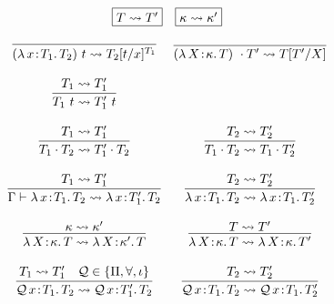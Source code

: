 \documentclass{article}
\newcommand{\abs}[4]{{#1}\, #2\! : \! #3.\, #4}
\begin{document}
\begin{figure}
  \[
    \begin{array}{c}
      \fbox{\(T \rightsquigarrow T'\)}
      \quad \fbox{\(\kappa \rightsquigarrow \kappa'\)}
      \\ \\
      \begin{array}{cc}
        \infer{
         (\abs{\lambda}{x}{T_1}{T_2})\ t
         \rightsquigarrow
         T_2 [t/x]^{T_1}
        }{}
        &
          \infer{
           (\abs{\lambda}{X}{\kappa}{T})\ \cdot T'
           \rightsquigarrow
           T [T'/X]
          }{}
        \\ \\
        \infer{
         T_1\ t
         \rightsquigarrow
         T_1'\ t
        }{
         T_1 \rightsquigarrow T_1'
        }
        \\ \\
          \infer{
           T_1 \cdot T_2
           \rightsquigarrow
           T_1' \cdot T_2
          }{
           T_1 \rightsquigarrow T_1'
          }
        & 
        \infer{
         T_1 \cdot T_2
         \rightsquigarrow T_1 \cdot T_2'
        }{
         T_2 \rightsquigarrow T_2'
        }
        \\ \\
        \infer{
         \Gamma \vdash \abs{\lambda}{x}{T_1}{T_2} \leadsto \abs{\lambda}{x}{T_1'}{T_2}
        }{
         T_1 \leadsto T_1'
        }
        &
        \infer{
         \abs{\lambda}{x}{T_1}{T_2}
         \rightsquigarrow
         \abs{\lambda}{x}{T_1}{T_2'}
        }{
         T_2 \rightsquigarrow T_2'
        }
        \\ \\
        \infer{
         \abs{\lambda}{X}{\kappa}{T}
         \leadsto \abs{\lambda}{X}{\kappa'}{T}
        }{
         \kappa \leadsto \kappa'
        }
        &
        \infer{
         \abs{\lambda}{X}{\kappa}{T}
         \rightsquigarrow
         \abs{\lambda}{X}{\kappa}{T'}
        }{
         T \rightsquigarrow T'
        }
        \\ \\
          \infer{
           \abs{\mathcal{Q}}{x}{T_1}{T_2}
           \rightsquigarrow
           \abs{\mathcal{Q}}{x}{T_1'}{T_2}
          }{
           T_1 \rightsquigarrow T_1'
           \quad \mathcal{Q} \in \{\Pi,\forall,\iota\}
          }
        &
        \infer{
         \abs{\mathcal{Q}}{x}{T_1}{T_2}
         \rightsquigarrow
         \abs{\mathcal{Q}}{x}{T_1}{T_2'}
        }{
         T_2 \rightsquigarrow T_2'
}
\end{array}
\end{array}\]
\end{figure}
\end{document}
